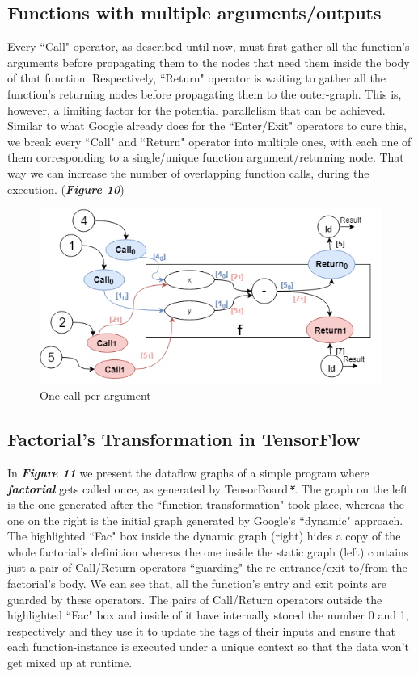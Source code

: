 \documentclass[ack,preface]{dithesis}
\begin{document}
    \subsection{Functions with multiple arguments/outputs}

Every ``Call" operator, as described until now, must first gather all the function's arguments before propagating them to the nodes that need them inside the body of that function. Respectively, ``Return" operator is waiting to gather all the function's returning nodes before propagating them to the outer-graph. This is, however, a limiting factor for the potential parallelism that can be achieved. Similar to what Google already does for the ``Enter/Exit" operators to cure this, we break every ``Call" and ``Return" operator into multiple ones, with each one of them corresponding to a single/unique function argument/returning node. That way we can increase the number of overlapping function calls, during the execution. (\textit{\textbf{Figure 10}})

\begin{figure}[h]
\centering
\includegraphics[scale=0.62]{figures/breakops}
\caption{One call per argument}
\end{figure}


    \subsection{Factorial's Transformation  in TensorFlow}
In  \textit{\textbf{Figure 11}} we present the dataflow graphs of a simple program where \textit{\textbf{factorial}} gets called once, as generated by TensorBoard\textit{\textbf{*}}. 
The graph on the left is the one generated after the ``function-transformation" took place, whereas the one on the right is the initial graph generated by Google's ``dynamic" approach.
The highlighted ``Fac" box inside the dynamic graph (right) hides a copy of the whole factorial's definition whereas the one inside the static graph (left) contains just a pair of Call/Return operators ``guarding" the re-entrance/exit to/from the  factorial's body. We can see that, all the function's entry and exit points are guarded by these operators. The pairs of Call/Return operators outside the highlighted ``Fac" box and inside of it  have internally stored the number 0 and 1, respectively and they use it to update the tags of their inputs and ensure that each function-instance is executed under a unique context so that the data won't get mixed up at runtime.
\end{document}
